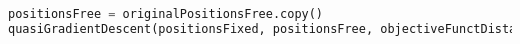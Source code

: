\begin{lstlisting}[language=Python, style=jupycolors]
positionsFree = originalPositionsFree.copy()
quasiGradientDescent(positionsFixed, positionsFree, objectiveFunctDistanceImportance, maxIter=30)
\end{lstlisting}